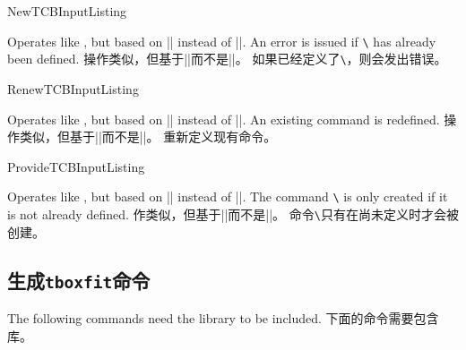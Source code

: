 \begin{docCommand}{NewTCBInputListing}{}
\begin{stripedbox}
Operates like , but based on |\NewDocumentCommand| instead of |\DeclareDocumentCommand|.
An error is issued if \texttt{\textbackslash} has already been defined.
\tcblower
操作类似，但基于|\NewDocumentCommand|而不是|\DeclareDocumentCommand|。
如果已经定义了\texttt{\textbackslash}，则会发出错误。
\end{stripedbox}
\end{docCommand}

\begin{docCommand}{RenewTCBInputListing}{}
\begin{stripedbox}
Operates like , but based on |\RenewDocumentCommand| instead of |\DeclareDocumentCommand|.
An existing command is redefined.
\tcblower
操作类似，但基于|\RenewDocumentCommand|而不是|\DeclareDocumentCommand|。
重新定义现有命令。
\end{stripedbox}
\end{docCommand}

\begin{docCommand}{ProvideTCBInputListing}{}
\begin{stripedbox}
Operates like , but based on |\ProvideDocumentCommand| instead of |\DeclareDocumentCommand|.
The command \texttt{\textbackslash} is only created if it is not already defined.
\tcblower
作类似，但基于|\ProvideDocumentCommand|而不是|\DeclareDocumentCommand|。
命令\texttt{\textbackslash}只有在尚未定义时才会被创建。
\end{stripedbox}
\end{docCommand} 

\subsection{生成\texttt{tboxfit}命令}\label{subsec:xparse_tcboxfit}
\begin{marker}
\begin{stripedbox}
The following commands need the  library to be included.
\tcblower
下面的命令需要包含库。
\end{stripedbox}
\end{marker}

